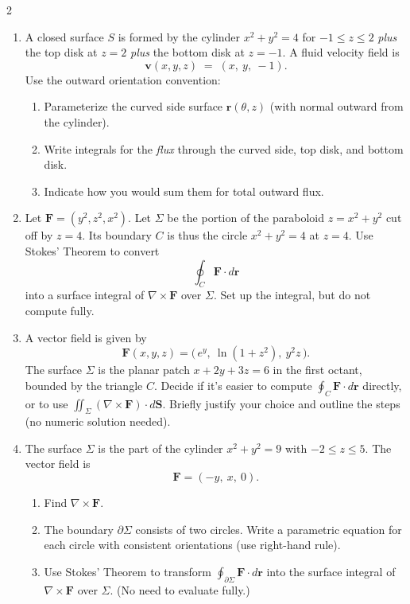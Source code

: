 \begin{multicols}{2}
\begin{enumerate}
\item \enspace
A closed surface \(S\) is formed by the cylinder \(x^2+y^2=4\) for \(-1\le z\le2\) \emph{plus} the top disk at \(z=2\) \emph{plus} the bottom disk at \(z=-1\). A fluid velocity field is
\[
\mathbf{v}(x,y,z)\;=\; (x,\ y,\ -1).
\]
Use the outward orientation convention:
\begin{enumerate}
\item Parameterize the curved side surface
\(\mathbf{r}(\theta,z)\) (with normal outward from the cylinder).
\item Write integrals for the \emph{flux} through the curved side, top disk, and bottom disk.
\item Indicate how you would sum them for total outward flux.
\end{enumerate}

\item \enspace
Let \(\mathbf{F} = (y^2, z^2, x^2)\). Let \(\Sigma\) be the portion of the paraboloid \(z = x^2 + y^2\) cut off by \(z = 4\). Its boundary \(C\) is thus the circle \(x^2 + y^2 = 4\) at \(z=4\). Use Stokes' Theorem to convert
\[
\oint_C \mathbf{F}\cdot d\mathbf{r}
\]
into a surface integral of \(\nabla\times\mathbf{F}\) over \(\Sigma\). Set up the integral, but do not compute fully.

\item \enspace
A vector field is given by
\[
\mathbf{F}(x,y,z)
= \bigl(\,e^y,\ \ln(1+z^2),\ y^2 z\,\bigr).
\]
The surface \(\Sigma\) is the planar patch \(x+2y+3z=6\) in the first octant, bounded by the triangle \(C\). Decide if it’s easier to compute 
\(\displaystyle \oint_C \mathbf{F}\cdot d\mathbf{r}\)
directly, or to use \(\iint_\Sigma (\nabla\times \mathbf{F})\cdot d\mathbf{S}\). Briefly justify your choice and outline the steps (no numeric solution needed).

\item \enspace
The surface \(\Sigma\) is the part of the cylinder \(x^2 + y^2 = 9\) with \(-2 \le z \le 5\). The vector field is
\[
\mathbf{F} = ( -y,\ x,\ 0 ).
\]
\begin{enumerate}
\item Find \(\nabla\times \mathbf{F}\).
\item The boundary \(\partial\Sigma\) consists of two circles. Write a parametric equation for each circle with consistent orientations (use right-hand rule).
\item Use Stokes’ Theorem to transform 
\(\displaystyle \oint_{\partial\Sigma}\mathbf{F}\cdot d\mathbf{r}\)
into the surface integral of \(\nabla\times\mathbf{F}\) over \(\Sigma\). (No need to evaluate fully.)
\end{enumerate}


\end{enumerate}
\end{multicols}
